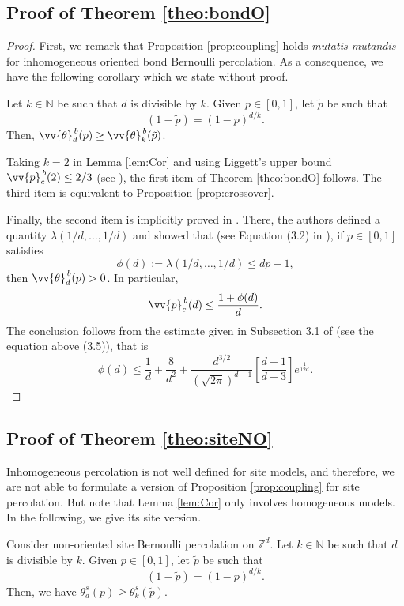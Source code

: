 \documentclass{aptpub}
\newcommand{\N}{\mathbb{N}}
\newcommand{\Z}{\mathbb{Z}}
\begin{document}
\subsection{Proof of Theorem \ref{theo:bondO}}
\begin{proof}
First, we remark that  Proposition \ref{prop:coupling} holds {\it mutatis mutandis} for inhomogeneous oriented bond Bernoulli percolation. As a consequence, we have the following corollary which we state without proof.
\begin{lem}\label{lem:Cor}
Let $k \in \N$ be such that $d$ is divisible by $k$. Given $p \in [0,1]$, let $\tilde{p}$ be such that 
\[(1-\tilde{p}) = (1-p)^{d/k}.\]
Then,  $\vv{\theta}^{\, b}_d(p) \geq \vv{\theta}_k^{\, b}(\tilde{p})$.
\end{lem}

Taking $k=2$ in Lemma \ref{lem:Cor} and using  Liggett's upper bound $\vv{p}_c^{\, b}(2) \leq 2/3$ (see \cite{L}), the first item of Theorem \ref{theo:bondO} follows. The third item is equivalent to Proposition \ref{prop:crossover}. 

 Finally, the second item is implicitly proved in \cite{GPS}. 
 There, the authors defined a quantity $\lambda(1/d, \dots, 1/d)$ and showed that (see  Equation (3.2) in \cite{GPS}), if $p \in [0,1]$ satisfies
\[\phi(d) :=  \lambda(1/d, \dots, 1/d) \leq dp -1,\]
then $\vv{\theta}^{\, b}_d(p) > 0$. In particular, 
\[ \vv{p}_c^{\, b}(d) \leq \frac{1+\phi(d)}{d}.\]
The conclusion follows from the estimate given in Subsection 3.1 of \cite{GPS} (see the equation above (3.5)), that is
\[\phi(d) \leq \frac{1}{d}+\frac{8}{d^2}+\frac{d^{3/2}}{(\sqrt{2\pi})^{d-1}}\left[\frac{d-1}{d-3}\right]e^{\frac{1}{12d}}. \]
\end{proof}






\subsection{Proof of Theorem \ref{theo:siteNO}}
Inhomogeneous percolation is not well defined for site models, and therefore, we are not able to  formulate a version of Proposition \ref{prop:coupling} for site percolation. But note that Lemma \ref{lem:Cor} only involves homogeneous models. In the following, we give its site version.

\begin{lem}\label{lem:ksite}
Consider non-oriented site Bernoulli percolation on $\Z^{d}$. Let $k \in \N$ be such that $d$ is divisible by $k$. Given $p \in [0,1]$, let $\tilde{p}$ be such that 
\[(1-\tilde{p}) = (1-p)^{d/k}.\]
Then, we have ${\theta}^s_d(p) \geq {\theta}^s_k(\tilde{p})$.
\end{lem} 
\end{document}

